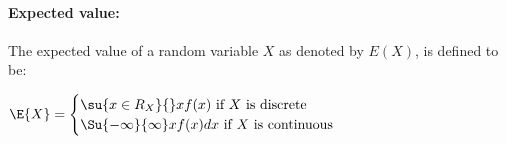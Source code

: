 \paragraph{Expected value:}
The expected value of a random variable $X$ as denoted by
$E\left( X \right)$, is defined to be:
\begin{center}
	$\E{X}=
	\begin{cases}
		\su{x\in R_{X}}{{}}xf(x)\text{ if }X\text{ is discrete}\\
		\Su{-\infty}{\infty}xf(x)dx\text{ if }X\text{ is continuous}
	\end{cases}$
\end{center}
